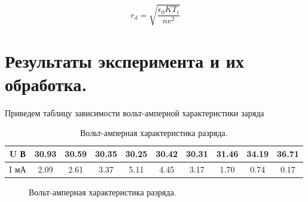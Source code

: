 \documentclass[a4paper,12pt]{article} %
\begin{document}
\begin{equation}\label{5.18}
r_d = \sqrt{ \frac{\epsilon_0 K T_i}{n e^2} }
\end{equation}

\section{Результаты эксперимента и их обработка.}

Приведем таблицу зависимости вольт-амперной характеристики заряда

\begin{table}[H]
\caption{\label{tab:canonsummary} Вольт-амперная характеристика разряда.}
\begin{center}
\begin{tabular}{|c|c|c|c|c|c|c|c|c|c|}
\hline
U В & 30.93 & 30.59 & 30.35 & 30.25 & 30.42 & 30.31 & 31.46 & 34.19 & 36.71\\
\hline
I мА & 2.09 & 2.61 & 3.37 & 5.11 & 4.45 & 3.17 & 1.70 & 0.74 & 0.17\\
\hline
\end{tabular}
\end{center}
\label{table1:ref}
\end{table}

\begin{figure}[H]\label{rlx}
 	\caption{Вольт-амперная характеристика разряда.}
\label{fig:image}
\end{figure}
\end{document}
